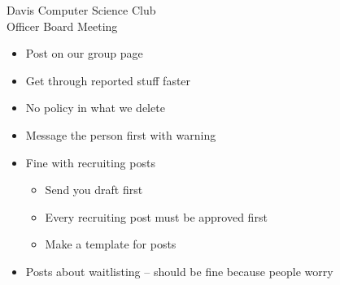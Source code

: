 \documentclass{article}
\begin{document}
\begin{Minutes}{Davis Computer Science Club\\Officer Board Meeting}





\maketitle

\begin{itemize}
\item Post on our group page
\item Get through reported stuff faster
\item No policy in what we delete
\item Message the person first with warning \item Fine with recruiting posts
	\begin {itemize}
	\item Send you draft first
	\item Every recruiting post must be approved first
	\item Make a template for posts
	\end {itemize}
\item Posts about waitlisting -- should be fine because people worry
\end {itemize}




\end{Minutes}
\end{document}
